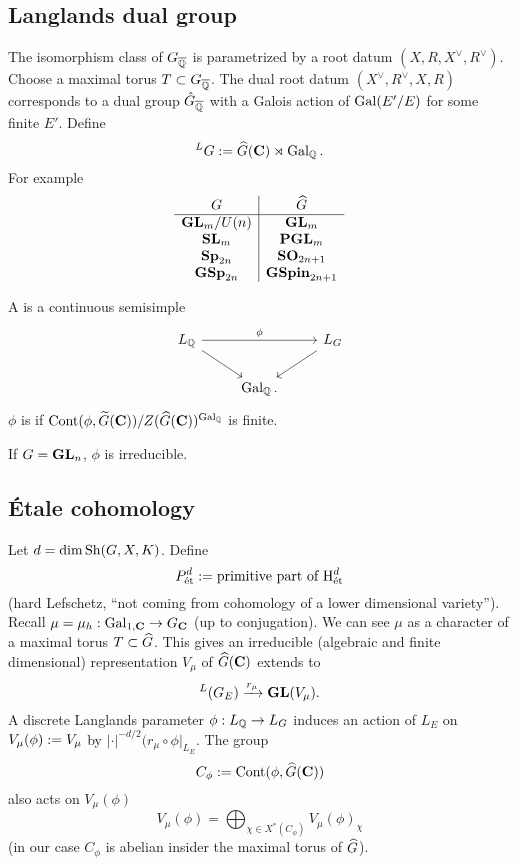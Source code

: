 \subsection{Langlands dual group}
The isomorphism class of $G_{\overline{\mathbb Q}}$ is parametrized by a root datum $(X,R,X^{\vee},R^{\vee})$. Choose a maximal torus $T\subset G_{\overline{\mathbb Q}}$. The dual root datum $(X^{\vee},R^{\vee},X,R)$ corresponds to a dual group $\hat{G}_{\overline{\mathbb Q}}$ with a Galois action of $\operatorname{Gal}(E' /E)$ for some finite $E'$. Define
\[
	^{L}G := \widehat{G}(\mathbf{C})\rtimes \operatorname{Gal}_\mathbb Q.
\] 
For example
\[
\begin{array}{c|c}
	G & \widehat{G} \\ \hline
	\mathbf{GL}_m / U(n) & \mathbf{GL}_m \\
	\mathbf{SL}_m & \mathbf{PGL}_m \\
	\mathbf{Sp}_{2n} & \mathbf{SO}_{2n+1} \\
	\mathbf{GSp}_{2n} & \mathbf{GSpin}_{2n+1}
\end{array}
\] 
\begin{definition}
	A  is a continuous semisimple
	\[
	\begin{tikzcd}
		L_\Q \ar[rr,"\phi"] \ar[dr] & & L_G \ar[dl] \\
					    & \Gal_\Q.
	\end{tikzcd}
	\] 
	$\phi$ is  if $\operatorname{Cont}(\phi,\widetilde{G}(\mathbf{C})) /Z(\widehat{G}(\mathbf{C}))^{\operatorname{Gal}_\mathbb Q}$ is finite.
\end{definition}
If $G=\mathbf{GL}_n$, $\phi$ is irreducible.

\subsection{\'Etale cohomology}
Let $d=\dim \operatorname{Sh}(G,X,K)$. Define
\[
P^{d}_{\text{\'et}} := \text{primitive part of }\mathrm{H}^{d}_{\text{\'et}}
\] 
(hard Lefschetz, ``not coming from cohomology of a lower dimensional variety''). Recall $\mu=\mu_h:\Gal_{1,\C}\to G_{\C}$ (up to conjugation). We can see $\mu$ as a character of a maximal torus $T\subset \widehat{G}$. This gives an irreducible (algebraic and finite dimensional) representation $V_\mu$ of $\widehat{G}(\mathbf{C})$ extends to
\[
	^{L}(G_E) \xrightarrow{r_\mu} \mathbf{GL}(V_\mu).
\] 
A discrete Langlands parameter $\phi:L_\Q\to L_G$ induces an action of $L_E$ on $V_\mu(\phi):= V_\mu$ by $|\cdot |^{-d /2}(r_{\mu}\circ\phi|_{L_E}$. The group
\[
	C_\phi := \operatorname{Cont}(\phi,\widehat{G}(\mathbf{C}))
\] 
also acts on $V_\mu(\phi)$ 
\[
V_\mu(\phi) = \bigoplus_{\chi\in X^{*}(C_\phi)}V_\mu(\phi)_\chi
\] 
(in our case $C_\phi$ is abelian insider the maximal torus of $\widehat{G}$).

